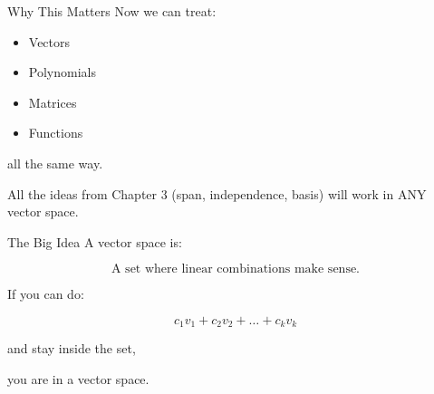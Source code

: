 \documentclass{beamer}
\begin{document}

\begin{frame}{Why This Matters}
Now we can treat:

\begin{itemize}
    \item Vectors
    \item Polynomials
    \item Matrices
    \item Functions
\end{itemize}

all the same way.

All the ideas from Chapter 3 (span, independence, basis)
will work in ANY vector space.
\end{frame}


\begin{frame}{The Big Idea}
A vector space is:

\[
\text{A set where linear combinations make sense.}
\]

If you can do:

\[
c_1 v_1 + c_2 v_2 + \dots + c_k v_k
\]

and stay inside the set,

you are in a vector space.
\end{frame}

\end{document}
